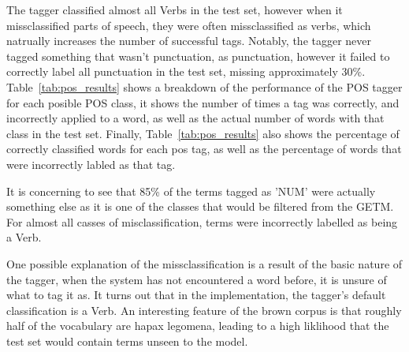 \documentclass[10pt]{report}
\begin{document}
The tagger classified almost all Verbs in the test set, however when it missclassified parts of speech, they were often missclassified as verbs, which natrually increases the number of successful tags. Notably, the tagger never tagged something that wasn't punctuation, as punctuation, however it failed to correctly label all punctuation in the test set, missing approximately 30\%. Table~\ref{tab:pos_results} shows a breakdown of the performance of the POS tagger for each posible POS class, it shows the number of times a tag was correctly, and incorrectly applied to a word, as well as the actual number of words with that class in the test set. Finally, Table~\ref{tab:pos_results} also shows the percentage of correctly classified words for each pos tag, as well as the percentage of words that were incorrectly labled as that tag.

It is concerning to see that 85\% of the terms tagged as 'NUM' were actually something else as it is one of the classes that would be filtered from the GETM. For almost all casses of misclassification, terms were incorrectly labelled as being a Verb.

One possible explanation of the missclassification is a result of the basic nature of the tagger, when the system has not encountered a word before, it is unsure of what to tag it as. It turns out that in the implementation, the tagger's default classification is a Verb. An interesting feature of the brown corpus is that roughly half of the vocabulary are hapax legomena, leading to a high liklihood that the test set would contain terms unseen to the model. 
\end{document}
